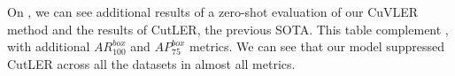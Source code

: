 On , we can see additional results of a zero-shot evaluation of our CuVLER method and the results of CutLER, the previous SOTA. This table complement , with additional $AR^{box}_{100}$ and $AP^{box}_{75}$ metrics. We can see that our model suppressed CutLER across all the datasets in almost all metrics.

